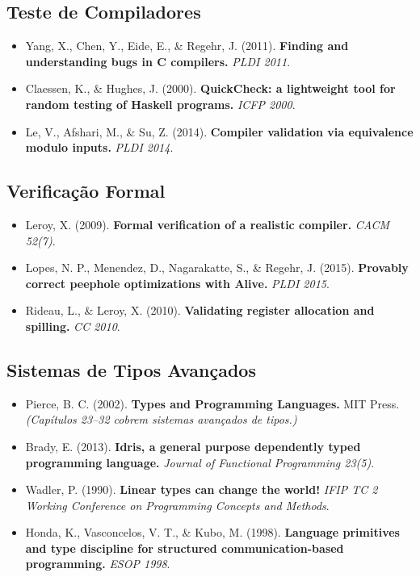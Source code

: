 \subsection{Teste de Compiladores}

\begin{itemize}
  \item Yang, X., Chen, Y., Eide, E., \& Regehr, J. (2011).
    \textbf{Finding and understanding bugs in C compilers.}
    \emph{PLDI 2011}.
  \item Claessen, K., \& Hughes, J. (2000).
    \textbf{QuickCheck: a lightweight tool for random testing of
    Haskell programs.} \emph{ICFP 2000}.
  \item Le, V., Afshari, M., \& Su, Z. (2014).
    \textbf{Compiler validation via equivalence modulo inputs.}
    \emph{PLDI 2014}.
\end{itemize}

\subsection{Verificação Formal}

\begin{itemize}
  \item Leroy, X. (2009).
    \textbf{Formal verification of a realistic compiler.}
    \emph{CACM 52(7)}.
  \item Lopes, N. P., Menendez, D., Nagarakatte, S., \& Regehr, J.
    (2015). \textbf{Provably correct peephole optimizations with Alive.}
    \emph{PLDI 2015}.
  \item Rideau, L., \& Leroy, X. (2010).
    \textbf{Validating register allocation and spilling.} \emph{CC 2010}.
\end{itemize}

\subsection{Sistemas de Tipos Avançados}

\begin{itemize}
  \item Pierce, B. C. (2002).
    \textbf{Types and Programming Languages.} MIT Press.
    \emph{(Capítulos 23--32 cobrem sistemas avançados de tipos.)}
  \item Brady, E. (2013).
    \textbf{Idris, a general purpose dependently typed programming
    language.} \emph{Journal of Functional Programming 23(5)}.
  \item Wadler, P. (1990).
    \textbf{Linear types can change the world!}
    \emph{IFIP TC 2 Working Conference on Programming Concepts and
    Methods}.
  \item Honda, K., Vasconcelos, V. T., \& Kubo, M. (1998).
    \textbf{Language primitives and type discipline for structured
    communication-based programming.} \emph{ESOP 1998}.
\end{itemize}


